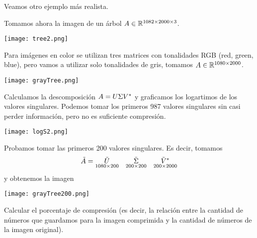 Veamos otro ejemplo más realista.

\begin{ejemplo}

Tomamos ahora la imagen de un \'arbol $\Ab \in \R^{1082 \times 2000 \times 3}$.

\begin{center}
\texttt{[image: tree2.png]}
\end{center}

Para imágenes en color se utilizan tres matrices con tonalidades RGB (red, green, blue), pero vamos a utilizar solo tonalidades de gris, tomamos $\Ab \in \R^{1080 \times 2000}$.

\begin{center}
\texttt{[image: grayTree.png]}
\end{center}

Calculamos la descomposición $\Ab = \Ub \Sigmab \Vb^*$ y graficamos los logartimos de los valores singulares. Podemos tomar los primeros 987 valores singulares sin casi perder información, pero no es suficiente compresión.

\begin{center}
\texttt{[image: logS2.png]}
\end{center}

Probamos tomar las primeros 200 valores singulares. Es decir, tomamos
$$\tilde \Ab = \underset{1080 \times 200}{\tilde \Ub} \quad
\underset{200 \times 200} {\tilde \Sigmab} \quad
\underset{200 \times 2000}{\tilde \Vb^*}
$$
y obtenemos la imagen
\begin{center}
\texttt{[image: grayTree200.png]}
\end{center}

\end{ejemplo}

\begin{ejercicio} 
Calcular el porcentaje de compresión (es decir, la relación entre la cantidad de números que guardamos para la imagen comprimida y la cantidad de números de la imagen original).
\end{ejercicio}


